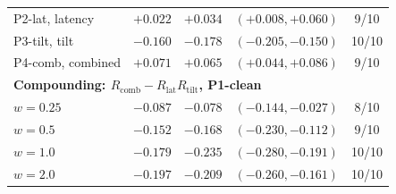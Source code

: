 \begin{tabular}{@{}l r r c c@{}}
P2-lat, latency & $+0.022$ & $+0.034$ & $(+0.008,+0.060)$ & 9/10 \\
P3-tilt, tilt & $-0.160$ & $-0.178$ & $(-0.205,-0.150)$ & 10/10 \\
P4-comb, combined & $+0.071$ & $+0.065$ & $(+0.044,+0.086)$ & 9/10 \\
\midrule
\multicolumn{5}{l}{\textbf{Compounding: $R_{\text{comb}}-R_{\text{lat}}R_{\text{tilt}}$, P1-clean}} \\
$w=0.25$ & $-0.087$ & $-0.078$ & $(-0.144,-0.027)$ & 8/10 \\
$w=0.5$ & $-0.152$ & $-0.168$ & $(-0.230,-0.112)$ & 9/10 \\
$w=1.0$ & $-0.179$ & $-0.235$ & $(-0.280,-0.191)$ & 10/10 \\
$w=2.0$ & $-0.197$ & $-0.209$ & $(-0.260,-0.161)$ & 10/10 \\
\bottomrule
\end{tabular}
